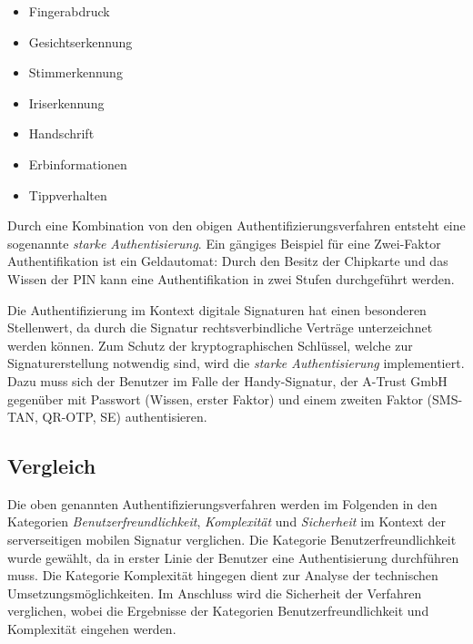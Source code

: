 \documentclass[11pt,a4paper,ngerman]{scrreprt}
\begin{document}
\begin{description}[font=\rmfamily]
    \begin{itemize}
        \item Fingerabdruck
        \item Gesichtserkennung
        \item Stimmerkennung
        \item Iriserkennung
        \item Handschrift
        \item Erbinformationen
        \item Tippverhalten
    \end{itemize}
\end{description}
Durch eine Kombination von den obigen Authentifizierungsverfahren entsteht eine sogenannte \emph{starke Authentisierung}. Ein gängiges Beispiel für eine Zwei-Faktor Authentifikation ist ein Geldautomat: Durch den Besitz der Chipkarte und das Wissen der PIN kann eine Authentifikation in zwei Stufen durchgeführt werden.

Die Authentifizierung im Kontext digitale Signaturen hat einen besonderen Stellenwert, da durch die Signatur rechtsverbindliche Verträge unterzeichnet werden können. Zum Schutz der kryptographischen Schlüssel, welche zur Signaturerstellung notwendig sind, wird die \emph{starke Authentisierung} implementiert. Dazu muss sich der Benutzer im Falle der Handy-Signatur, der A-Trust GmbH gegenüber mit Passwort (Wissen, erster Faktor) und einem zweiten Faktor (SMS-TAN, QR-OTP, SE) authentisieren.

\subsection{Vergleich}\label{sec:AuthentifizierungVergleich}
Die oben genannten Authentifizierungsverfahren werden im Folgenden in den Kategorien \emph{Benutzerfreundlichkeit}, \emph{Komplexität} und \emph{Sicherheit} im Kontext der serverseitigen mobilen Signatur verglichen. Die Kategorie Benutzerfreundlichkeit wurde gewählt, da in erster Linie der Benutzer eine Authentisierung durchführen muss. Die Kategorie Komplexität hingegen dient zur Analyse der technischen Umsetzungsmöglichkeiten. Im Anschluss wird die Sicherheit der Verfahren verglichen, wobei die Ergebnisse der Kategorien Benutzerfreundlichkeit und Komplexität eingehen werden.
\end{document}
